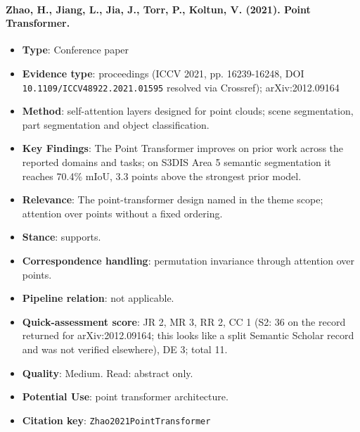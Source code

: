 \documentclass[journal,onecolumn]{IEEEtran}
\begin{document}
\paragraph{Zhao, H., Jiang, L., Jia, J., Torr, P., Koltun, V. (2021). Point Transformer.~\cite{Zhao2021PointTransformer}}\mbox{}

\begin{itemize}

\item{} \textbf{Type}: Conference paper

\item{} \textbf{Evidence type}: proceedings (ICCV 2021, pp. 16239-16248, DOI \nolinkurl{10.1109/ICCV48922.2021.01595} resolved via Crossref); arXiv:2012.09164

\item{} \textbf{Method}: self-attention layers designed for point clouds; scene segmentation, part segmentation and object classification.

\item{} \textbf{Key Findings}: The Point Transformer improves on prior work across the reported domains and tasks; on S3DIS Area 5 semantic segmentation it reaches 70.4\% mIoU, 3.3 points above the strongest prior model.

\item{} \textbf{Relevance}: The point-transformer design named in the theme scope; attention over points without a fixed ordering.

\item{} \textbf{Stance}: supports.

\item{} \textbf{Correspondence handling}: permutation invariance through attention over points.

\item{} \textbf{Pipeline relation}: not applicable.

\item{} \textbf{Quick-assessment score}: JR 2, MR 3, RR 2, CC 1 (S2: 36 on the record returned for arXiv:2012.09164; this looks like a split Semantic Scholar record and was not verified elsewhere), DE 3; total 11.

\item{} \textbf{Quality}: Medium. Read: abstract only.

\item{} \textbf{Potential Use}: point transformer architecture.

\item{} \textbf{Citation key}: \texttt{Zhao2021PointTransformer}

\end{itemize}
\end{document}
